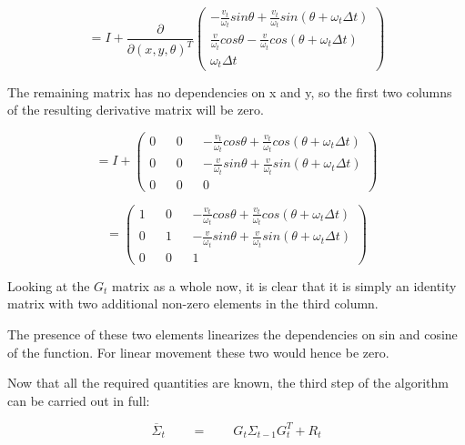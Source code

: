 \documentclass[a4paper]{article}
\begin{document}
\begin{equation*}
    = I + \frac{\partial}{\partial (x, y, \theta)^T}
    \begin{pmatrix}
        - \frac{v_t}{\omega_t} sin\theta + \frac{v_t}{\omega_t} sin (\theta + \omega_t \Delta t)
        \\ \frac{v}{\omega_t} cos\theta - \frac{v}{\omega_t} cos (\theta + \omega_t \Delta t) 
        \\ \omega_t \Delta t
    \end{pmatrix}
\end{equation*}

The remaining matrix has no dependencies on x and y, so the first two columns of the resulting derivative matrix will be zero.

\begin{equation*}
    = I + 
    \begin{pmatrix}
        0 && 0 && - \frac{v_t}{\omega_t} cos\theta + \frac{v_t}{\omega_t} cos (\theta + \omega_t \Delta t)
        \\ 
        0 && 0 && - \frac{v}{\omega_t} sin\theta + \frac{v}{\omega_t} sin (\theta + \omega_t \Delta t) 
        \\ 
        0 && 0 && 0
    \end{pmatrix}
\end{equation*}

\begin{equation*}
=
\begin{pmatrix}
        1 && 0 && - \frac{v_t}{\omega_t} cos\theta + \frac{v_t}{\omega_t} cos (\theta + \omega_t \Delta t)
        \\ 
        0 && 1 && - \frac{v}{\omega_t} sin\theta + \frac{v}{\omega_t} sin (\theta + \omega_t \Delta t) 
        \\ 
        0 && 0 && 1
    \end{pmatrix}
\end{equation*}

Looking at the $G_t$ matrix as a whole now, it is clear that it is simply an identity matrix with two additional non-zero elements in the third column. 

The presence of these two elements linearizes the dependencies on sin and cosine of the function. For linear movement these two would hence be zero.

Now that all the required quantities are known, the third step of the algorithm can be carried out in full:

\begin{equation*}
    \overline{\Sigma}_t 
    \qquad 
    = 
    \qquad
    G_t \Sigma_{t-1} G_t^T + R_t
\end{equation*}
\end{document}
